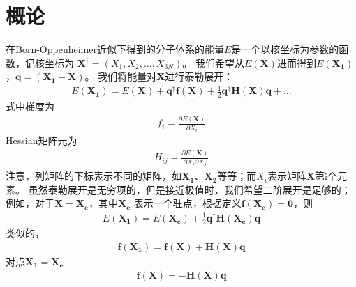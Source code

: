 \section{概论}
\label{secC.2}
在Born-Oppenheimer近似下得到的分子体系的能量$E$是一个以核坐标为参数的函数，记核坐标为
$\mathbf{X}^{\dagger}=(X_1,X_2,\dots,X_{3N})$。
我们希望从$E(\mathbf{X})$进而得到$E(\mathbf{X_1})$，$\mathbf{q=(X_1-X)}$。
我们将能量对$\mathbf{X}$进行泰勒展开：
\begin{align}
	\label{C.1}
	E(\mathbf{X_1})=E(\mathbf{X})+\mathbf{q}^{\dagger}\mathbf{f(X)}
                    +\frac{1}{2}\mathbf{q}^{\dagger}\mathbf{H(X)}\mathbf{q}+\dots
\end{align}
式中梯度为
\begin{align}
	f_i=\frac{\partial E(\mathbf{X})}{\partial X_i}
    \nonumber
\end{align}
Hessian矩阵元为
\begin{align}
	H_{ij}=\frac{\partial E(\mathbf{X})}{\partial X_i\partial X_j}
    \nonumber
\end{align}
注意，列矩阵的下标表示不同的矩阵，如$\mathbf{X_1}$、$\mathbf{X_2}$等等；而$X_i$表示矩阵$\mathbf{X}$第i个元素。
虽然泰勒展开是无穷项的，但是接近极值时，我们希望二阶展开是足够的；例如，对于$\mathbf{X}=\mathbf{X_e}$，其中$\mathbf{X_e}$
表示一个驻点，根据定义$\mathbf{f(X_e)=0}$，则
\begin{align}
	\nonumber
	E(\mathbf{X_1})=E(\mathbf{X_e})+\frac{1}{2}\mathbf{q}^{\dagger}\mathbf{H(X_e)}\mathbf{q}
\end{align}
类似的，
\begin{align}
	\label{C.2}
	\mathbf{f(X_1)}=\mathbf{f(X)}+\mathbf{H(X)}\mathbf{q}
\end{align}
对点$\mathbf{X_1}=\mathbf{X_e}$
\begin{align}
	\label{C.3}
	\mathbf{f(X)}=-\mathbf{H(X)}\mathbf{q}
\end{align}

